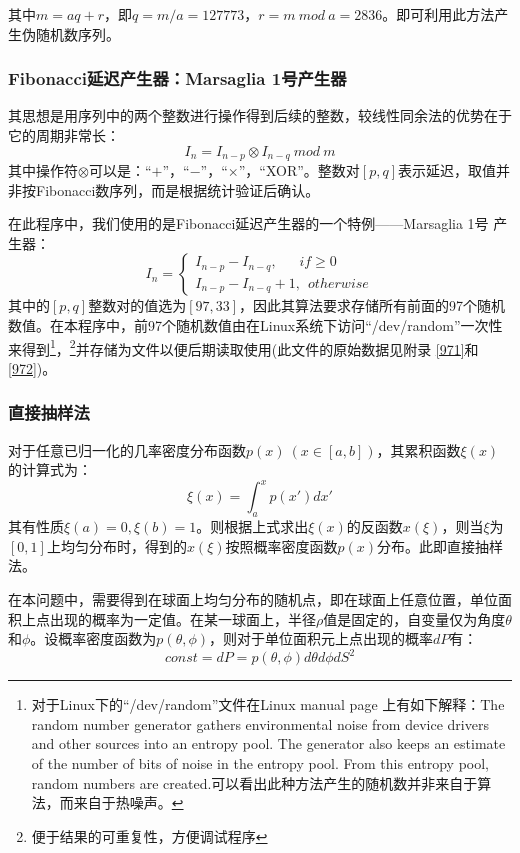 \documentclass[a4paper,11pt]{article}
\begin{document}
其中$m=aq+r$，即$q=m/a=127773$，$r=m \ mod \ a=2836$。即可利用此方法产生伪随机数序列。


\subsubsection{Fibonacci延迟产生器：Marsaglia 1号产生器}
其思想是用序列中的两个整数进行操作得到后续的整数，较线性同余法的优势在于它的周期非常长：
\begin{equation}
	I_{n}=I_{n-p} \otimes I_{n-q} \ mod \  m
\end{equation}
其中操作符$\otimes$可以是：“$+$”，“$-$”，“$\times$”，“XOR”。整数对$[p,q]$表示延迟，取值并非按Fibonacci数序列，而是根据统计验证后确认。

在此程序中，我们使用的是Fibonacci延迟产生器的一个特例——Marsaglia 1号 产生器：
\begin{equation}
	I_{n}=\left\{
	\begin{array}{l}
		I_{n-p} - I_{n-q},  \ \ \ \ \ \ \ if \geq 0 \\
		I_{n-p} - I_{n-q}+1, \ \ otherwise
	\end{array}
	\right.
\end{equation}
其中的$[p,q]$整数对的值选为$[97,33]$，因此其算法要求存储所有前面的97个随机数值。在本程序中，前97个随机数值由在Linux系统下访问“/dev/random”一次性来得到\footnote{对于Linux下的“/dev/random”文件在Linux manual page 上有如下解释：The random number generator gathers environmental noise from device
       drivers and other sources into an entropy pool.  The generator also
       keeps an estimate of the number of bits of noise in the entropy pool.
       From this entropy pool, random numbers are created.可以看出此种方法产生的随机数并非来自于算法，而来自于热噪声。}，\footnote{便于结果的可重复性，方便调试程序}并存储为文件以便后期读取使用(此文件的原始数据见附录 \ref{971}和\ref{972})。


\subsubsection{直接抽样法}
对于任意已归一化的几率密度分布函数$p(x)~(x \in [a,b])$，其累积函数$\xi(x)$的计算式为：
\begin{equation}
	\xi(x) = \int_{a}^{x} p(x') dx'
\end{equation}
其有性质$\xi(a) = 0,\xi(b) =1$。则根据上式求出$\xi(x)$的反函数$x(\xi)$，则当$\xi$为$[0,1]$上均匀分布时，得到的$x(\xi)$按照概率密度函数$p(x)$分布。此即直接抽样法。

在本问题中，需要得到在球面上均匀分布的随机点，即在球面上任意位置，单位面积上点出现的概率为一定值。在某一球面上，半径$\rho$值是固定的，自变量仅为角度$\theta$和$\phi$。设概率密度函数为$p(\theta,\phi)$，则对于单位面积元上点出现的概率$d P$有：
\begin{equation}
	const = d P =p(\theta,\phi)d \theta d \phi dS^{2}
\end{equation}
\end{document}
